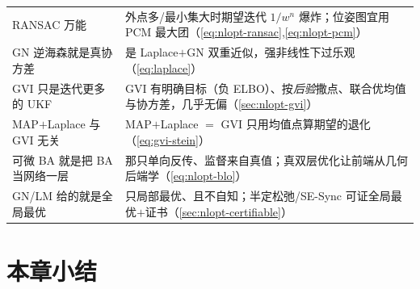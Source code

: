 \begin{table}[H]
\begin{tabular}{p{} p{}}
RANSAC 万能 & 外点多/最小集大时期望迭代 $1/w^n$ 爆炸；位姿图宜用 PCM 最大团（\cref{eq:nlopt-ransac},\cref{eq:nlopt-pcm}）\\
GN 逆海森就是真协方差 & 是 Laplace$+$GN 双重近似，强非线性下过乐观（\cref{eq:laplace}）\\
GVI 只是迭代更多的 UKF & GVI 有明确目标（负 ELBO）、按\emph{后验}撒点、联合优均值与协方差，几乎无偏（\cref{sec:nlopt-gvi}）\\
MAP$+$Laplace 与 GVI 无关 & MAP$+$Laplace $=$ GVI 只用均值点算期望的退化（\cref{eq:gvi-stein}）\\
可微 BA 就是把 BA 当网络一层 & 那只单向反传、监督来自真值；真双层优化让前端从几何后端学（\cref{eq:nlopt-blo}）\\
GN/LM 给的就是全局最优 & 只局部最优、且不自知；半定松弛/SE-Sync 可证全局最优$+$证书（\cref{sec:nlopt-certifiable}）\\
\bottomrule
\end{tabular}
\end{table}

\section*{本章小结}

